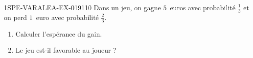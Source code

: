 \begin{exercice}{1SPE-VARALEA-EX-019}{1}{10}
Dans un jeu, on gagne $5$~euros avec probabilité $\frac{1}{3}$ et on perd $1$~euro avec probabilité $\frac{2}{3}$.

\begin{enumerate}
  \item Calculer l'espérance du gain.
  \item Le jeu est-il favorable au joueur ?
\end{enumerate}
\end{exercice}
